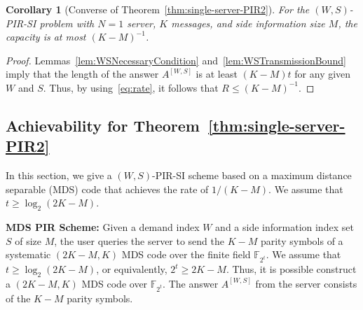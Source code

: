\documentclass[letterpaper, 10 pt, conference]{ieeeconf}
\newtheorem{corollary}{Corollary}
\newcommand{\A}[2]{A^{[#1,#2]}} %
\newcommand{\GF}[1]{\mathbb{F}_{#1}} %
\begin{document}
\begin{corollary}[Converse of Theorem~\ref{thm:single-server-PIR2}]
For the $(W,S)$-PIR-SI problem with $N=1$ server, $K$ messages, and side information size $M$, the capacity is at most $(K-M)^{-1}$.
\end{corollary}

\begin{proof}
Lemmas~\ref{lem:WSNecessaryCondition} and~\ref{lem:WSTransmissionBound} imply that the length of the answer $\A{W}{S}$ is at least $(K-M)t$ for any given $W$ and $S$. Thus, by using~\eqref{eq:rate}, it follows that $R\leq (K-M)^{-1}$. %
\end{proof}

\subsection{Achievability for Theorem~\ref{thm:single-server-PIR2}}
\label{sec:achievability-mds}

In this section, we give a $(W,S)$-PIR-SI scheme based on a maximum distance separable (MDS) code that achieves the rate of $1/(K - M)$. We assume that $t\geq \log_2(2K-M)$. %

\textbf{MDS PIR Scheme:} Given a demand index $W$ and a side information index set $S$ of size $M$, the user queries the server to send the $K - M$ parity symbols of a systematic $(2K - M, K)$ MDS code over the finite field $\GF{2^t}$. We assume that  $t\geq\log_2(2K-M)$, or equivalently, $2^t \geq 2K - M$. Thus, it is possible construct a $(2K - M,K)$ MDS code over $\GF{2^t}$. The answer $\A{W}{S}$ from the server consists of the $K - M$ parity symbols. %
\end{document}
